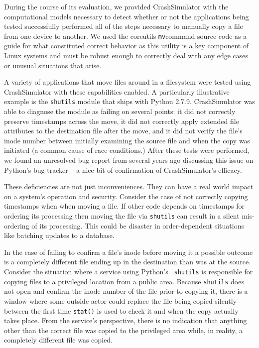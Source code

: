     During the course of its evaluation, we provided CrashSimulator with the computational models necessary to detect
    whether or not the applications being tested successfully performed all of the steps necessary to manually copy a
    file from one device to another.  We used the coreutils {\tt mv}command source code as a guide for what constituted
    correct behavior as this utility is a key component of Linux systems and must be robust enough to correctly deal
    with any edge cases or unusual situations that arise.

    A variety of applications that move files around in a filesystem were tested using CrashSimulator with these
    capabilities enabled.  A particularly illustrative example is the {\tt shutils} module that ships with Python 2.7.9.
    CrashSimulator was able to diagnose the module as failing on several points: it did not correctly preserve
    timestamps across the move, it did not correctly apply extended file attributes to the destination file after the
    move, and it did not verify the file's inode number between initially examining the source file and when the copy
    was initiated (a common cause of race conditions.)  After these tests were performed, we found an unresolved bug
    report from several years ago discussing this issue on Python's bug tracker -- a nice bit of confirmation of
    CrashSimulator's efficacy.

    These deficiencies are not just inconveniences.  They can have a real world impact on a system's operation and
    security.  Consider the case of not correctly copying timestamps when when moving a file.  If other code depends on
    timestamps for ordering its processing then moving the file via {\tt shutils} can result in a silent mis-ordering of
    its processing.  This could be disaster in order-dependent situations like batching updates to a database.

    In the case of failing to confirm a file's inode before moving it a possible outcome is a completely different file
    ending up in the destination than was at the source.  Consider the situation where a service using Python's {\tt
      shutils} is responsible for copying files to a privileged location from a public area.  Because {\tt shutils} does
    not open and confirm the inode number of the file prior to copying it, there is a window where some outside actor
    could replace the file being copied silently between the first time {\tt stat()} is used to check it and when the
    copy actually takes place.  From the service's perspective, there is no indication that anything other than the
    correct file was copied to the privileged area while, in reality, a completely different file was copied.

